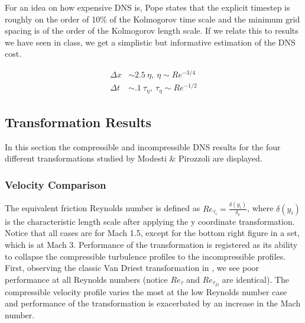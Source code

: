 For an idea on how expensive DNS is, Pope states that the explicit timestep is roughly on the order of 10\% of the Kolmogorov time scale and the minimum grid spacing is of the order of the Kolmogorov length scale. If we relate this to results we have seen in class, we get a simplistic but informative estimation of the DNS cost.

\begin{align*} %
  \Delta x & \sim  2.5 \ \eta,  \ \eta \sim Re^{-3/4}         \\
  \Delta t & \sim  .1 \ \tau_\eta, \ \tau_\eta \sim Re^{-1/2}
\end{align*}

\subsection{Transformation Results}
In this section the compressible and incompressible DNS results for the four different transformations studied by Modesti \& Pirozzoli are displayed.
\subsubsection{Velocity Comparison}
The equivalent friction Reynolds number is defined as $Re_{\tau_i} = \frac{\delta(y_i)}{\delta_\nu}$, where $\delta(y_i)$ is the characteristic length scale after applying the y coordinate transformation.  Notice that all cases are for Mach 1.5, except for the bottom right figure in a set, which is at Mach 3. Performance of the transformation is registered as its ability to collapse the compressible turbulence profiles to the incompressible profiles. First, observing the classic Van Driest transformation in , we see poor performance at all Reynolds numbers (notice $Re_\tau$ and $Re_{\tau_D}$ are identical). The compressible velocity profile varies the most at the low Reynolds number case and performance of the transformation is exacerbated by an increase in the Mach number.

